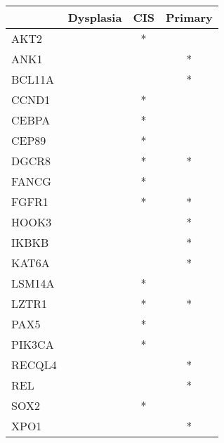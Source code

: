 \begin{tabular}{lccc}
\toprule
{} & Dysplasia & CIS & Primary \\
\midrule
AKT2   &           &   * &         \\
ANK1   &           &     &       * \\
BCL11A &           &     &       * \\
CCND1  &           &   * &         \\
CEBPA  &           &   * &         \\
CEP89  &           &   * &         \\
DGCR8  &           &   * &       * \\
FANCG  &           &   * &         \\
FGFR1  &           &   * &       * \\
HOOK3  &           &     &       * \\
IKBKB  &           &     &       * \\
KAT6A  &           &     &       * \\
LSM14A &           &   * &         \\
LZTR1  &           &   * &       * \\
PAX5   &           &   * &         \\
PIK3CA &           &   * &         \\
RECQL4 &           &     &       * \\
REL    &           &     &       * \\
SOX2   &           &   * &         \\
XPO1   &           &     &       * \\
\bottomrule
\end{tabular}
